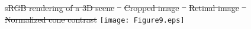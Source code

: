 \documentclass{jov}
\providecommand{\DIFdeltex}[1]{{\protect\color{red}\sout{#1}}}                      %
\providecommand{\DIFdelFL}[1]{\DIFdel{#1}} %
\providecommand{\DIFaddbeginFL}{} %
\providecommand{\DIFaddendFL}{} %
\providecommand{\DIFdelbeginFL}{} %
\providecommand{\DIFdelendFL}{} %
\providecommand{\DIFdel}[1]{\texorpdfstring{\DIFdeltex{#1}}{}} %
\newcommand{\DIFscaledelfig}{0.5}
\newlength{\DIFdelgraphicswidth} %
\newlength{\DIFdelgraphicsheight} %
\newcommand{\DIFaddincludegraphics}[2][]{{\color{blue}\fbox{\DIFOincludegraphics[#1]{#2}}}} %
\newcommand{\DIFdelincludegraphics}[2][]{%
\sbox{\DIFdelgraphicsbox}{\DIFOincludegraphics[#1]{#2}}%
\settoboxwidth{\DIFdelgraphicswidth}{\DIFdelgraphicsbox} %
\settoboxtotalheight{\DIFdelgraphicsheight}{\DIFdelgraphicsbox} %
\scalebox{\DIFscaledelfig}{%
\parbox[b]{\DIFdelgraphicswidth}{\usebox{\DIFdelgraphicsbox}\\[-\baselineskip] \rule{\DIFdelgraphicswidth}{0em}}\llap{\resizebox{\DIFdelgraphicswidth}{\DIFdelgraphicsheight}{%
\setlength{\unitlength}{\DIFdelgraphicswidth}%
\begin{picture}(1,1)%
\thicklines\linethickness{2pt} %
{\color[rgb]{1,0,0}\put(0,0){\framebox(1,1){}}}%
{\color[rgb]{1,0,0}\put(0,0){\line( 1,1){1}}}%
{\color[rgb]{1,0,0}\put(0,1){\line(1,-1){1}}}%
\end{picture}%
}\hspace*{3pt}}} %
} %
\DeclareRobustCommand{\DIFaddbeginFL}{\DIFOaddbeginFL \let\includegraphics\DIFaddincludegraphics} %
\DeclareRobustCommand{\DIFaddendFL}{\DIFOaddendFL \let\includegraphics\DIFOincludegraphics} %
\DeclareRobustCommand{\DIFdelbeginFL}{\DIFOdelbeginFL \let\includegraphics\DIFdelincludegraphics} %
\DeclareRobustCommand{\DIFdelendFL}{\DIFOaddendFL \let\includegraphics\DIFOincludegraphics} %
\begin{document}
\begin{figure}
\centering
    \DIFdelbeginFL %
{%
\DIFdelFL{sRGB rendering of a 3D scene}}
\DIFdelFL{~ 
    }%
\DIFdelFL{\hspace{0.1 \textwidth}
        }%
{%
\DIFdelFL{Cropped image}}
\DIFdelFL{~ 
    }%
\DIFdelFL{\hspace{0.1 \textwidth}
        }%
{%
\DIFdelFL{Retinal image}}
\DIFdelFL{~
    }%
{%
\DIFdelFL{Normalized cone contrast}}        
\DIFdelendFL \DIFaddbeginFL \texttt{[image: Figure9.eps]}
    \DIFaddendFL \label{fig:sceneWithCroppedImage}

\end{figure}
\end{document}
